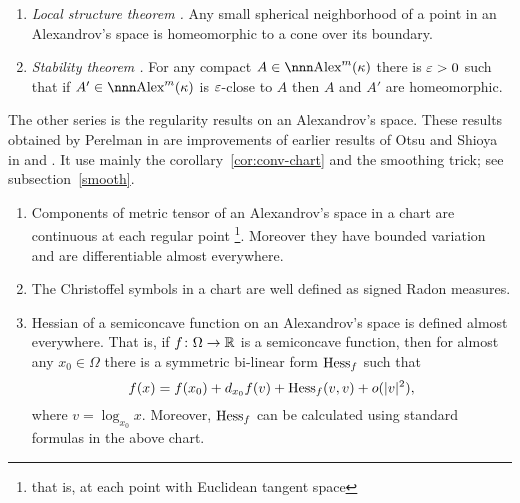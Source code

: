 \documentclass{article}
\begin{document}
\begin{enumerate}[$\diamond$]

\item{\it Local structure theorem \cite{perelman:morse}.}
Any small spherical neighborhood of a point in an Alexandrov's space is homeomorphic to a cone over its boundary.

\item{\it Stability theorem \cite{perelman:spaces2}.} 
For any compact $A\in \Alex^m(\kappa)$ there is $\varepsilon>0$ such that if $A'\in \Alex^m(\kappa)$ is $\varepsilon$-close to $A$ then $A$ and $A'$ are homeomorphic.

\end{enumerate}
The other series is the regularity results on an Alexandrov's space. 
These results obtained by Perelman in \cite{perelman:DC} 
are improvements of earlier results of Otsu and Shioya in \cite{otsu-shioya} and \cite{otsu:second-der}. 
It use mainly
the corollary~\ref{cor:conv-chart} and the smoothing trick; see subsection~\ref{smooth}. 
\begin{enumerate}[$\diamond$]
\item Components of metric tensor of an Alexandrov's space in a chart are continuous
at each regular point%
\footnote{that is, at each point with Euclidean tangent space}. 
Moreover they have bounded variation and are differentiable almost everywhere.
\item The Christoffel symbols  in a chart are well defined as signed Radon measures.
\item Hessian of a semiconcave function on an Alexandrov's space is defined almost
everywhere. 
That is, if $f\colon\Omega\to\mathbb{R}$ is a semiconcave function, then for almost
any $x_0\in \Omega$ there is a symmetric bi-linear form $\operatorname{Hess}_f$ such that
$$f(x)
=
f(x_0)+d_{x_0}f(v)+\operatorname{Hess}_f(v,v)+o(|v|^2),$$
where $v=\log_{x_0}x$. 
Moreover, $\operatorname{Hess}_f$ can be calculated using  standard formulas in the above
chart.
\end{enumerate}
\end{document}
